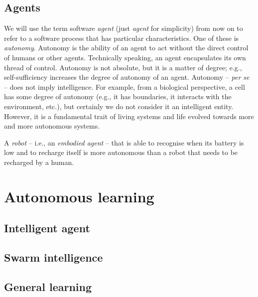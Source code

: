 \subsubsection{}\label{subsubsec:rl}

\subsection{Agents}\label{subsec:agents}
%
We will use the term software \emph{agent} (just \emph{agent} for simplicity) from now on to refer to a software process that has particular characteristics.
%
One of these is \emph{autonomy}.
%
Autonomy is the ability of an agent to act without the direct control of humans or other agents.
%
Technically speaking, an agent encapsulates its own thread of control.
%
Autonomy is not absolute, but it is a matter of degree; e.g., self-sufficiency increases the degree of autonomy of an agent.
%
Autonomy -- \emph{per se} -- does not imply intelligence.
%
For example, from a biological perspective, a cell has some degree of autonomy (e.g., it has boundaries, it interacts with the environment, etc.), but certainly we do not consider it an intelligent entity.
%
However, it is a fundamental trait of living systems and life evolved towards more and more autonomous systems.


A \emph{robot} -- i.e., an \emph{embodied agent} -- that is able to recognise when its battery is low and to recharge itself is more autonomous than a robot that needs to be recharged by a human.


\section{Autonomous learning}\label{sec:autonomous-learning}

\subsection{Intelligent agent}\label{subsec:intelligent-agent}

\subsection[Multi-agent systems]{}\label{subsec:mas}

\subsection{Swarm intelligence}\label{subsec:swarm-intelligence}


\subsection{General learning}\label{subsec:general-learning}
